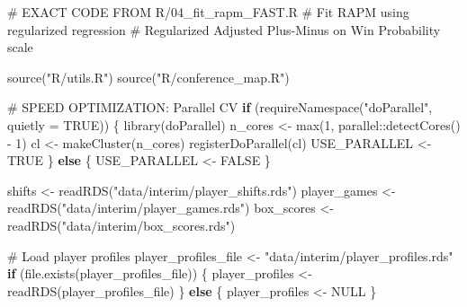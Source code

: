\documentclass[
  letterpaper,
  DIV=11,
  numbers=noendperiod]{scrartcl}
\newenvironment{Shaded}{\begin{snugshade}}{\end{snugshade}}
\newcommand{\AttributeTok}[1]{\textcolor[rgb]{0.40,0.45,0.13}{#1}}
\newcommand{\CommentTok}[1]{\textcolor[rgb]{0.37,0.37,0.37}{#1}}
\newcommand{\ConstantTok}[1]{\textcolor[rgb]{0.56,0.35,0.01}{#1}}
\newcommand{\ControlFlowTok}[1]{\textcolor[rgb]{0.00,0.23,0.31}{\textbf{#1}}}
\newcommand{\DecValTok}[1]{\textcolor[rgb]{0.68,0.00,0.00}{#1}}
\newcommand{\FunctionTok}[1]{\textcolor[rgb]{0.28,0.35,0.67}{#1}}
\newcommand{\NormalTok}[1]{\textcolor[rgb]{0.00,0.23,0.31}{#1}}
\newcommand{\OtherTok}[1]{\textcolor[rgb]{0.00,0.23,0.31}{#1}}
\newcommand{\SpecialCharTok}[1]{\textcolor[rgb]{0.37,0.37,0.37}{#1}}
\newcommand{\StringTok}[1]{\textcolor[rgb]{0.13,0.47,0.30}{#1}}
\begin{document}
\begin{Shaded}
\begin{Highlighting}[]
\CommentTok{\# EXACT CODE FROM R/04\_fit\_rapm\_FAST.R}
\CommentTok{\# Fit RAPM using regularized regression }
\CommentTok{\# Regularized Adjusted Plus{-}Minus on Win Probability scale}

\FunctionTok{source}\NormalTok{(}\StringTok{"R/utils.R"}\NormalTok{)}
\FunctionTok{source}\NormalTok{(}\StringTok{"R/conference\_map.R"}\NormalTok{)}

\CommentTok{\# SPEED OPTIMIZATION: Parallel CV}
\ControlFlowTok{if}\NormalTok{ (}\FunctionTok{requireNamespace}\NormalTok{(}\StringTok{"doParallel"}\NormalTok{, }\AttributeTok{quietly =} \ConstantTok{TRUE}\NormalTok{)) \{}
  \FunctionTok{library}\NormalTok{(doParallel)}
\NormalTok{  n\_cores }\OtherTok{\textless{}{-}} \FunctionTok{max}\NormalTok{(}\DecValTok{1}\NormalTok{, parallel}\SpecialCharTok{::}\FunctionTok{detectCores}\NormalTok{() }\SpecialCharTok{{-}} \DecValTok{1}\NormalTok{)}
\NormalTok{  cl }\OtherTok{\textless{}{-}} \FunctionTok{makeCluster}\NormalTok{(n\_cores)}
  \FunctionTok{registerDoParallel}\NormalTok{(cl)}
\NormalTok{  USE\_PARALLEL }\OtherTok{\textless{}{-}} \ConstantTok{TRUE}
\NormalTok{\} }\ControlFlowTok{else}\NormalTok{ \{}
\NormalTok{  USE\_PARALLEL }\OtherTok{\textless{}{-}} \ConstantTok{FALSE}
\NormalTok{\}}

\NormalTok{shifts }\OtherTok{\textless{}{-}} \FunctionTok{readRDS}\NormalTok{(}\StringTok{"data/interim/player\_shifts.rds"}\NormalTok{)}
\NormalTok{player\_games }\OtherTok{\textless{}{-}} \FunctionTok{readRDS}\NormalTok{(}\StringTok{"data/interim/player\_games.rds"}\NormalTok{)}
\NormalTok{box\_scores }\OtherTok{\textless{}{-}} \FunctionTok{readRDS}\NormalTok{(}\StringTok{"data/interim/box\_scores.rds"}\NormalTok{)}

\CommentTok{\# Load player profiles}
\NormalTok{player\_profiles\_file }\OtherTok{\textless{}{-}} \StringTok{"data/interim/player\_profiles.rds"}
\ControlFlowTok{if}\NormalTok{ (}\FunctionTok{file.exists}\NormalTok{(player\_profiles\_file)) \{}
\NormalTok{  player\_profiles }\OtherTok{\textless{}{-}} \FunctionTok{readRDS}\NormalTok{(player\_profiles\_file)}
\NormalTok{\} }\ControlFlowTok{else}\NormalTok{ \{}
\NormalTok{  player\_profiles }\OtherTok{\textless{}{-}} \ConstantTok{NULL}
\NormalTok{\}}


\end{Highlighting}
\end{Shaded}
\end{document}
